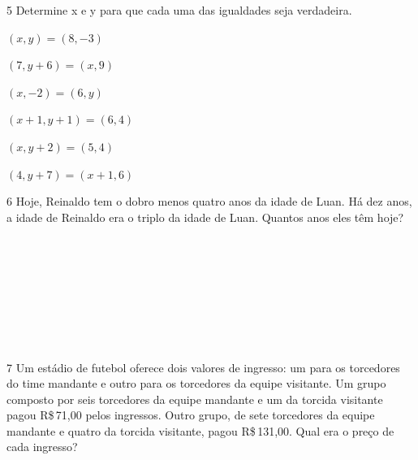 \num{5} Determine x e y para que cada uma das igualdades seja verdadeira.

\begin{escolha}
\item $(x, y ) = ( 8, -3)$
\item $(7, y + 6) = (x, 9)$
\item $(x, -2) = (6, y)$
\item $(x + 1, y + 1) = (6, 4)$
\item $(x, y + 2) = (5, 4)$
\item $(4, y + 7) = (x + 1, 6)$
\end{escolha}

\num{6} Hoje, Reinaldo tem o dobro menos quatro anos da idade de Luan. Há dez
anos, a idade de Reinaldo era o triplo da idade de Luan. Quantos anos
eles têm hoje?

\\
\\
\\
\\
\\
\\
\\

\pagebreak

\num{7} Um estádio de futebol oferece dois valores de ingresso: um para os
torcedores do time mandante e outro para os torcedores da equipe visitante. Um
grupo composto por seis torcedores da equipe mandante e um da torcida
visitante pagou R\$\,71,00 pelos ingressos. Outro grupo, de sete torcedores da
equipe mandante e quatro da torcida visitante, pagou R\$\,131,00. Qual era o
preço de cada ingresso?

